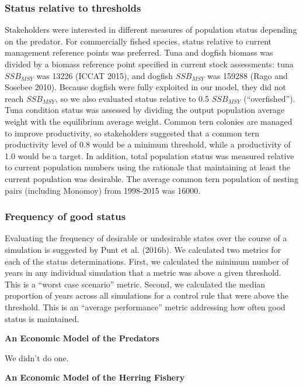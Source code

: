 \documentclass[]{article}
\begin{document}
\subsubsection{Status relative to
thresholds}\label{status-relative-to-thresholds}

Stakeholders were interested in different measures of population status
depending on the predator. For commercially fished species, status
relative to current management reference points was preferred. Tuna and
dogfish biomass was divided by a biomass reference point specified in
current stock assessments: tuna \(SSB_{MSY}\) was 13226 (ICCAT 2015),
and dogfish \(SSB_{MSY}\) was 159288 (Rago and Sosebee 2010). Because
dogfish were fully exploited in our model, they did not reach
\(SSB_{MSY}\), so we also evaluated status relative to 0.5 \(SSB_{MSY}\)
(``overfished''). Tuna condition status was assessed by dividing the
output population average weight with the equilibrium average weight.
Common tern colonies are managed to improve productivity, so
stakeholders suggested that a common tern productivity level of 0.8
would be a minimum threshold, while a productivity of 1.0 would be a
target. In addition, total population status was measured relative to
current population numbers using the rationale that maintaining at least
the current population was desirable. The average common tern population
of nesting pairs (including Monomoy) from 1998-2015 was 16000.

\subsubsection{Frequency of good status}\label{frequency-of-good-status}

Evaluating the frequency of desirable or undesirable states over the
course of a simulation is suggested by Punt et al. (2016b). We
calculated two metrics for each of the status determinations. First, we
calculated the minimum number of years in any individual simulation that
a metric was above a given threshold. This is a ``worst case scenario''
metric. Second, we calculated the median proportion of years across all
simulations for a control rule that were above the threshold. This is an
``average performance'' metric addressing how often good status is
maintained.

\textbf{An Economic Model of the Predators}

We didn't do one.

\textbf{An Economic Model of the Herring Fishery}
\end{document}
